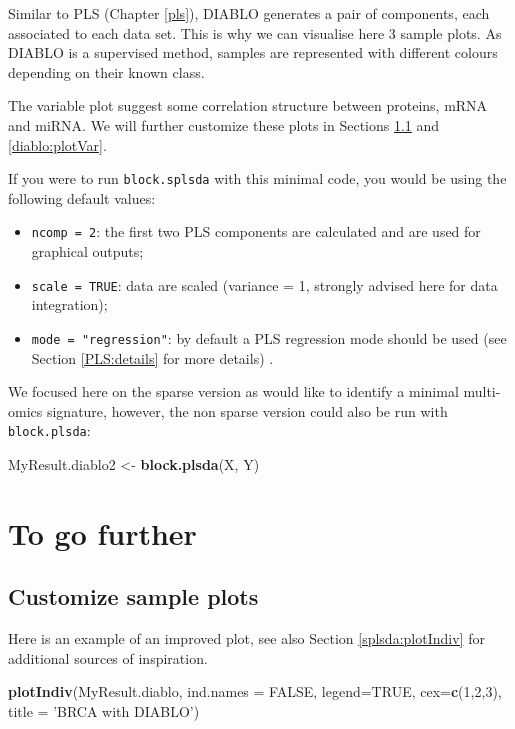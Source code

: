 \documentclass[]{book}
\newenvironment{Shaded}{\begin{snugshade}}{\end{snugshade}}
\newcommand{\KeywordTok}[1]{\textcolor[rgb]{0.13,0.29,0.53}{\textbf{#1}}}
\newcommand{\DataTypeTok}[1]{\textcolor[rgb]{0.13,0.29,0.53}{#1}}
\newcommand{\DecValTok}[1]{\textcolor[rgb]{0.00,0.00,0.81}{#1}}
\newcommand{\StringTok}[1]{\textcolor[rgb]{0.31,0.60,0.02}{#1}}
\newcommand{\OtherTok}[1]{\textcolor[rgb]{0.56,0.35,0.01}{#1}}
\newcommand{\NormalTok}[1]{#1}
\providecommand{\tightlist}{%
  \setlength{\itemsep}{0pt}\setlength{\parskip}{0pt}}
\theoremstyle{definition}
\theoremstyle{definition}
\theoremstyle{definition}
\theoremstyle{remark}
\begin{document}
Similar to PLS (Chapter \ref{pls}), DIABLO generates a pair of
components, each associated to each data set. This is why we can
visualise here 3 sample plots. As DIABLO is a supervised method, samples
are represented with different colours depending on their known class.

The variable plot suggest some correlation structure between proteins,
mRNA and miRNA. We will further customize these plots in Sections
\ref{diablo:plotIndiv} and \ref{diablo:plotVar}.

If you were to run \texttt{block.splsda} with this minimal code, you
would be using the following default values:

\begin{itemize}
\tightlist
\item
  \texttt{ncomp\ =\ 2}: the first two PLS components are calculated and
  are used for graphical outputs;
\item
  \texttt{scale\ =\ TRUE}: data are scaled (variance = 1, strongly
  advised here for data integration);
\item
  \texttt{mode\ =\ "regression"}: by default a PLS regression mode
  should be used (see Section \ref{PLS:details} for more details) .
\end{itemize}

We focused here on the sparse version as would like to identify a
minimal multi-omics signature, however, the non sparse version could
also be run with \texttt{block.plsda}:

\begin{Shaded}
\begin{Highlighting}[]
\NormalTok{MyResult.diablo2 <-}\StringTok{ }\KeywordTok{block.plsda}\NormalTok{(X, Y)}
\end{Highlighting}
\end{Shaded}

\section{To go further}\label{to-go-further-1}

\subsection{Customize sample plots}\label{diablo:plotIndiv}

Here is an example of an improved plot, see also Section
\ref{splsda:plotIndiv} for additional sources of inspiration.

\begin{Shaded}
\begin{Highlighting}[]
\KeywordTok{plotIndiv}\NormalTok{(MyResult.diablo, }
          \DataTypeTok{ind.names =} \OtherTok{FALSE}\NormalTok{, }
          \DataTypeTok{legend=}\OtherTok{TRUE}\NormalTok{, }\DataTypeTok{cex=}\KeywordTok{c}\NormalTok{(}\DecValTok{1}\NormalTok{,}\DecValTok{2}\NormalTok{,}\DecValTok{3}\NormalTok{),}
          \DataTypeTok{title =} \StringTok{'BRCA with DIABLO'}\NormalTok{)}
\end{Highlighting}
\end{Shaded}
\end{document}
